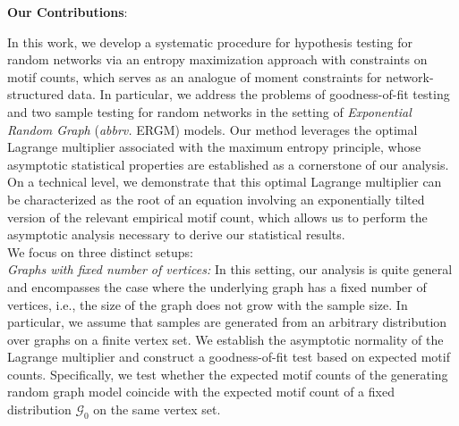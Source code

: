 \documentclass[12pt]{article}
\numberwithin{equation}{section}
\begin{document}
\textbf{Our Contributions}:

In this work, we develop a systematic procedure for hypothesis testing for random networks via an entropy maximization approach with constraints on motif counts, which serves as an analogue of moment constraints for network-structured data. In particular, we address the problems of goodness-of-fit testing and two sample testing for random networks in the setting of \emph{Exponential Random Graph} ({\it abbrv.} ERGM) models.  Our method leverages the optimal Lagrange multiplier associated with the maximum entropy principle, whose asymptotic statistical properties are established as a cornerstone of our analysis. On a technical level, we demonstrate that this optimal Lagrange multiplier can be characterized as the root of an equation involving an exponentially tilted version of the relevant empirical motif count, which allows us to perform the asymptotic analysis necessary to derive our statistical results. \\


We focus on three distinct setups:\\


\textit{Graphs with fixed number of vertices:} In this setting, our analysis is quite general and encompasses the case where the underlying graph has a fixed number of vertices, i.e., the size of the graph does not grow with the sample size. In particular, we assume that samples are generated from an arbitrary distribution over graphs on a finite vertex set. We establish the asymptotic normality of the Lagrange multiplier and construct a goodness-of-fit test based on expected motif counts. Specifically, we test whether the expected motif counts of the generating random graph model coincide with the expected motif count of a fixed distribution $\mathcal{G}_0$ on the same vertex set.\\
\end{document}
